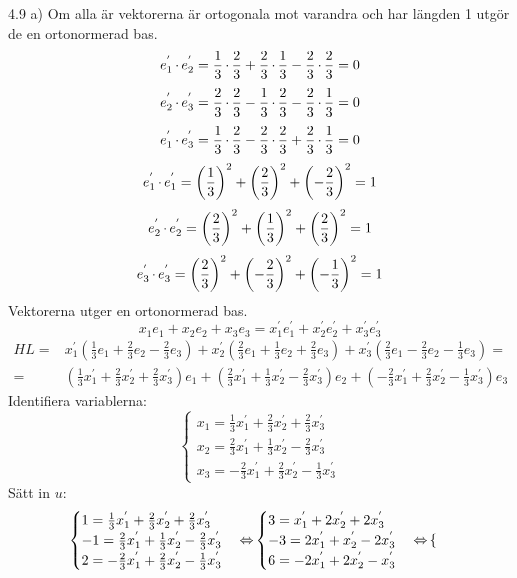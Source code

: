 \pagebreak
\begin{task}{4.9 a)}
	Om alla är vektorerna är ortogonala mot varandra och har längden 1 utgör de en ortonormerad bas.
	\[e^{'}_1\operatorname{\cdot}e^{'}_2=\frac{1}{3}\operatorname{\cdot}\frac{2}{3}+\frac{2}{3}\operatorname{\cdot}\frac{1}{3}-\frac{2}{3}\operatorname{\cdot}\frac{2}{3}=0\]
	\[e^{'}_2\operatorname{\cdot}e^{'}_3=\frac{2}{3}\operatorname{\cdot}\frac{2}{3}-\frac{1}{3}\operatorname{\cdot}\frac{2}{3}-\frac{2}{3}\operatorname{\cdot}\frac{1}{3}=0\]
	\[e^{'}_1\operatorname{\cdot}e^{'}_3=\frac{1}{3}\operatorname{\cdot}\frac{2}{3}-\frac{2}{3}\operatorname{\cdot}\frac{2}{3}+\frac{2}{3}\operatorname{\cdot}\frac{1}{3}=0\]
	\[e^{'}_1\operatorname{\cdot}e^{'}_1=\left(\frac{1}{3}\right)^2+\left(\frac{2}{3}\right)^2+\left(-\frac{2}{3}\right)^2=1\]
	\[e^{'}_2\operatorname{\cdot}e^{'}_2=\left(\frac{2}{3}\right)^2+\left(\frac{1}{3}\right)^2+\left(\frac{2}{3}\right)^2=1\]
	\[e^{'}_3\operatorname{\cdot}e^{'}_3=\left(\frac{2}{3}\right)^2+\left(-\frac{2}{3}\right)^2+\left(-\frac{1}{3}\right)^2=1\]
	Vektorerna utger en ortonormerad bas.
	\[x_1e_1+x_2e_2+x_3e_3=x^{'}_1e^{'}_1+x^{'}_2e^{'}_2+x^{'}_3e^{'}_3\]
	\begin{align*}
		HL=&
		x^{'}_1(\frac{1}{3}e_1+\frac{2}{3}e_2-\frac{2}{3}e_3)+
		x^{'}_2(\frac{2}{3}e_1+\frac{1}{3}e_2+\frac{2}{3}e_3)+
		x^{'}_3(\frac{2}{3}e_1-\frac{2}{3}e_2-\frac{1}{3}e_3)= \\ =
		&(\frac{1}{3}x^{'}_1+\frac{2}{3}x^{'}_2+\frac{2}{3}x^{'}_3)e_1+
		(\frac{2}{3}x^{'}_1+\frac{1}{3}x^{'}_2-\frac{2}{3}x^{'}_3)e_2+
		(-\frac{2}{3}x^{'}_1+\frac{2}{3}x^{'}_2-\frac{1}{3}x^{'}_3)e_3
	\end{align*}
	Identifiera variablerna:
	\[\begin{cases}
		x_1=\frac{1}{3}x^{'}_1+\frac{2}{3}x^{'}_2+\frac{2}{3}x^{'}_3 \\
		x_2=\frac{2}{3}x^{'}_1+\frac{1}{3}x^{'}_2-\frac{2}{3}x^{'}_3 \\
		x_3=-\frac{2}{3}x^{'}_1+\frac{2}{3}x^{'}_2-\frac{1}{3}x^{'}_3
	\end{cases}\]
	Sätt in $u$:
	\begin{align*}
		&\begin{cases}
			1=\frac{1}{3}x^{'}_1+\frac{2}{3}x^{'}_2+\frac{2}{3}x^{'}_3 \\
			-1=\frac{2}{3}x^{'}_1+\frac{1}{3}x^{'}_2-\frac{2}{3}x^{'}_3 \\
			2=-\frac{2}{3}x^{'}_1+\frac{2}{3}x^{'}_2-\frac{1}{3}x^{'}_3
		\end{cases} \operatorname{\Leftrightarrow}
		\begin{cases}
			3=x^{'}_1+2x^{'}_2+2x^{'}_3 \\
			-3=2x^{'}_1+x^{'}_2-2x^{'}_3 \\
			6=-2x^{'}_1+2x^{'}_2-x^{'}_3
		\end{cases} \operatorname{\Leftrightarrow}
		\begin{cases}

\end{cases}
\end{align*}
\end{task}
